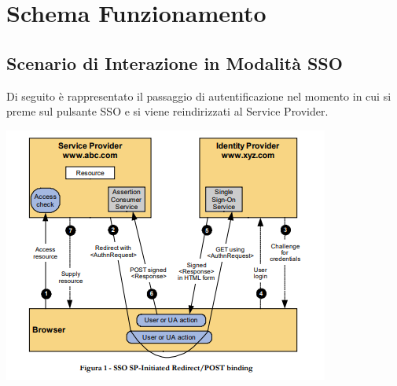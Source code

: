 \section{Schema Funzionamento}
\subsection{Scenario di Interazione in Modalità SSO}
Di seguito è rappresentato il passaggio di autentificazione nel momento in cui si preme sul pulsante SSO e si viene reindirizzati al Service Provider.
\begin{center}
	\includegraphics[scale = 1.4]{./res/images/ScenarioUsoSPIDSchema.PNG}
\end{center}